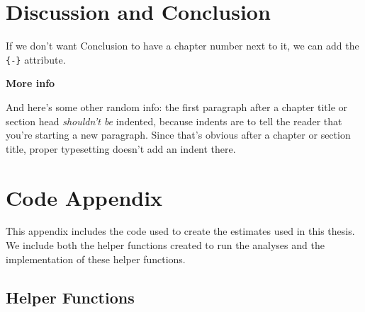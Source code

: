 \documentclass[12pt,twoside]{reedthesis}
\begin{document}
\hypertarget{discussion-and-conclusion}{%
\chapter{Discussion and Conclusion}\label{discussion-and-conclusion}}

If we don't want Conclusion to have a chapter number next to it, we can add the \texttt{\{-\}} attribute.

\textbf{More info}

And here's some other random info: the first paragraph after a chapter title or section head \emph{shouldn't be} indented, because indents are to tell the reader that you're starting a new paragraph. Since that's obvious after a chapter or section title, proper typesetting doesn't add an indent there.

\appendix

\hypertarget{code-appendix}{%
\chapter{Code Appendix}\label{code-appendix}}

This appendix includes the code used to create the estimates used in this thesis. We include both the helper functions created to run the analyses and the implementation of these helper functions.

\hypertarget{helper-functions}{%
\section{Helper Functions}\label{helper-functions}}
\end{document}
